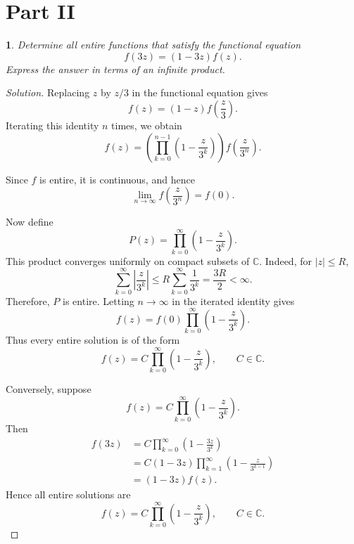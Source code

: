 \documentclass[12pt, a4paper]{report}
\theoremstyle{spaced}
\newtheorem{exercise}{}
\begin{document}
\section{Part II}
\begin{exercise}
	Determine all entire functions that satisfy the functional equation
	\[
		f(3z)=(1-3z)f(z).
	\]
	Express the answer in terms of an infinite product.
\end{exercise}
\begin{proof}[Solution]
	Replacing \(z\) by \(z/3\) in the functional equation gives
	\[
		f(z)=(1-z)f\left(\frac{z}{3}\right).
	\]
	Iterating this identity \(n\) times, we obtain
	\[
		f(z)
		=
		\left(
		\prod_{k=0}^{n-1}
		\left(1-\frac{z}{3^k}\right)
		\right)
		f\left(\frac{z}{3^n}\right).
	\]

	Since \(f\) is entire, it is continuous, and hence
	\[
		\lim_{n\to\infty}
		f\left(\frac{z}{3^n}\right)
		=
		f(0).
	\]

	Now define
	\[
		P(z)
		=
		\prod_{k=0}^{\infty}
		\left(1-\frac{z}{3^k}\right).
	\]
	This product converges uniformly on compact subsets of \(\mathbb{C}\).
	Indeed, for \(|z|\leq R\),
	\[
		\sum_{k=0}^{\infty}
		\left|\frac{z}{3^k}\right|
		\leq
		R\sum_{k=0}^{\infty}\frac{1}{3^k}
		=
		\frac{3R}{2}
		<\infty.
	\]
	Therefore, \(P\) is entire. Letting \(n\to\infty\) in the iterated
	identity gives
	\[
		f(z)
		=
		f(0)
		\prod_{k=0}^{\infty}
		\left(1-\frac{z}{3^k}\right).
	\]
	Thus every entire solution is of the form
	\[
		f(z)
		=
		C\prod_{k=0}^{\infty}
		\left(1-\frac{z}{3^k}\right),
		\qquad C\in\mathbb{C}.
	\]

	Conversely, suppose
	\[
		f(z)
		=
		C\prod_{k=0}^{\infty}
		\left(1-\frac{z}{3^k}\right).
	\]
	Then
	\[
		\begin{aligned}
			f(3z)
			 & =
			C\prod_{k=0}^{\infty}
			\left(1-\frac{3z}{3^k}\right)    \\
			 & =
			C(1-3z)
			\prod_{k=1}^{\infty}
			\left(1-\frac{z}{3^{k-1}}\right) \\
			 & =
			(1-3z)f(z).
		\end{aligned}
	\]
	Hence all entire solutions are
	\[
		f(z)
		=
		C\prod_{k=0}^{\infty}
		\left(1-\frac{z}{3^k}\right),
		\qquad C\in\mathbb{C}
		.
	\]
\end{proof}
\end{document}
